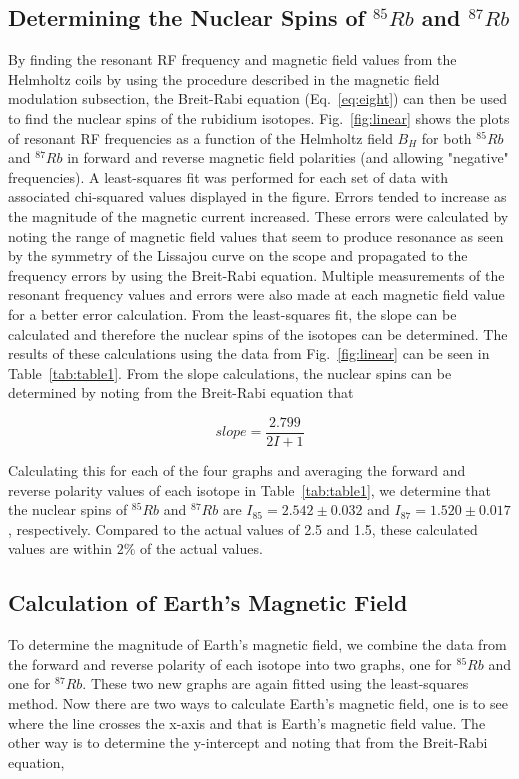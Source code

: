 \documentclass[%
 aip,
rsi,%
 amsmath,amssymb,
 reprint,%
author-numerical,%
]{revtex4-1}
\begin{document}
\subsection{Determining the Nuclear Spins of $^{85}Rb$ and $^{87}Rb$ }
By finding the resonant RF frequency and magnetic field values from the Helmholtz coils by using the procedure described in the magnetic field modulation subsection, the Breit-Rabi equation (Eq.~\ref{eq:eight}) can then be used to find the nuclear spins of the rubidium isotopes. Fig.~\ref{fig:linear} shows the plots of resonant RF frequencies as a function of the Helmholtz field $B_{H}$ for both $^{85}Rb$ and $^{87}Rb$ in forward and reverse magnetic field polarities (and allowing "negative" frequencies). \newline
\indent A least-squares fit was performed for each set of data with associated chi-squared values displayed in the figure. Errors tended to increase as the magnitude of the magnetic current increased. These errors were calculated by noting the range of magnetic field values that seem to produce resonance as seen by the symmetry of the Lissajou curve on the scope and propagated to the frequency errors by using the Breit-Rabi equation. Multiple measurements of the resonant frequency values and errors were also made at each magnetic field value for a better error calculation. \newline
\indent From the least-squares fit, the slope can be calculated and therefore the nuclear spins of the isotopes can be determined. The results of these calculations using the data from Fig.~\ref{fig:linear} can be seen in Table~\ref{tab:table1}. \newline 
\indent From the slope calculations, the nuclear spins can be determined by noting from the Breit-Rabi equation that 

\begin{equation}
slope=\frac{2.799}{2I+1}
\label{eq:twelve}
\end{equation}

Calculating this for each of the four graphs and averaging the forward and reverse polarity values of each isotope in Table~\ref{tab:table1}, we determine that the nuclear spins of $^{85}Rb$ and $^{87}Rb$ are $I_{85}=2.542\pm0.032$ and $I_{87}=1.520\pm0.017$, respectively. Compared to the actual values of 2.5 and 1.5, these calculated values are within $2\%$ of the actual values.




\subsection{Calculation of Earth's Magnetic Field}
To determine the magnitude of Earth's magnetic field, we combine the data from the forward and reverse polarity of each isotope into two graphs, one for $^{85}Rb$ and one for $^{87}Rb$. These two new graphs are again fitted using the least-squares method. \newline
\indent Now there are two ways to calculate Earth's magnetic field, one is to see where the line crosses the x-axis and that is Earth's magnetic field value. The other way is to determine the y-intercept and noting that from the Breit-Rabi equation,
\end{document}
